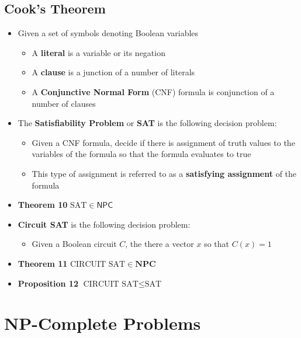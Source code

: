 \documentclass[11pt]{article}
\begin{document}
\subsection{Cook's Theorem}
\label{sec:org872f3a4}
\begin{itemize}
\item Given a set of symbols denoting Boolean variables
\begin{itemize}
\item A \textbf{literal} is a variable or its negation
\item A \textbf{clause} is a junction of a number of literals
\item A \textbf{Conjunctive Normal Form} (CNF) formula is conjunction of a number of clauses
\end{itemize}

\item The \textbf{Satisfiability Problem} or \textbf{SAT} is the following decision problem:
\begin{itemize}
\item Given a CNF formula, decide if there is assignment of truth values to the variables of the formula so that the formula evaluates to true
\item This type of assignment is referred to as a \textbf{satisfying assignment} of the formula
\end{itemize}

\item \textbf{Theorem 10} \(\text{SAT} \in \mathsf{NPC}\)

\item \textbf{Circuit SAT} is the following decision problem:
\begin{itemize}
\item Given a Boolean circuit \(C\), the there a vector \(x\) so that \(C(x) = 1\)
\end{itemize}

\item \textbf{Theorem 11} \(\text{CIRCUIT SAT} \in \mathbf{NPC}\)

\item \textbf{Proposition 12} \(\text{CIRCUIT SAT} \leq \text{SAT}\)
\end{itemize}

\section{NP-Complete Problems}
\label{sec:org92dc717}
\end{document}
